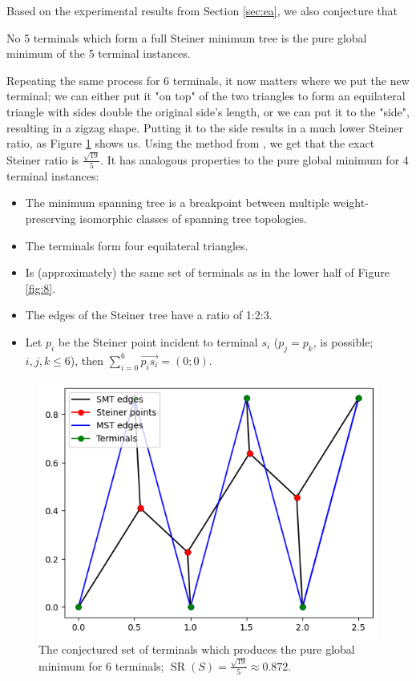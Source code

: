 \documentclass{mpaper}
\begin{document}
Based on the experimental results from Section \ref{sec:ea}, we also conjecture that
\begin{conjecture}
  No 5 terminals which form a full Steiner minimum tree is the pure global minimum of the 5 terminal instances.
\end{conjecture}

Repeating the same process for 6 terminals, it now matters where we put the new terminal; we can either put it "on top" of the two triangles to form an equilateral triangle with sides double the original side's length, or we can put it to the "side", resulting in a zigzag shape. Putting it to the side results in a much lower Steiner ratio, as Figure \ref{fig:14} shows us. Using the method from \cite{uteshev2021length}, we get that the exact Steiner ratio is $\frac{\sqrt{19}}{5}$. It has analogous properties to the pure global minimum for 4 terminal instances:

\begin{itemize}
  \item The minimum spanning tree is a breakpoint between multiple weight-preserving isomorphic classes of spanning tree topologies. %
  \item The terminals form four equilateral triangles.
  \item Is (approximately) the same set of terminals as in the lower half of Figure \ref{fig:8}.
  \item The edges of the Steiner tree have a ratio of 1:2:3.
  \item Let $p_i$ be the Steiner point incident to terminal $s_i$ ($p_j=p_k$, is possible; $i,j,k \leq 6$), then $\sum\limits_{i=0}^6\overrightarrow{p_is_i}=(0;0)$. 
\end{itemize}


\begin{figure}[h!]
  \begin{center}
  \includegraphics[scale=0.5]{plot13.png}
  \end{center}
  \caption{\label{fig:14} The conjectured set of terminals which produces the pure global minimum for 6 terminals; $\operatorname{SR}(S) = \frac{\sqrt{19}}{5}\approx 0.872$.}
\end{figure}
\end{document}
